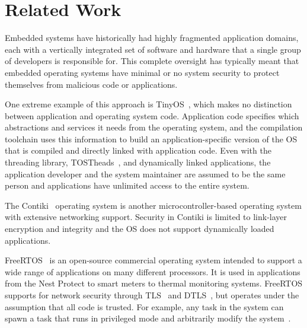 \section{Related Work}

Embedded systems have historically had highly fragmented application domains,
each with a vertically integrated set of software and hardware
that a single group of developers
is responsible for.
This complete oversight has typically meant
that embedded operating systems have
minimal or no system security to protect themselves from malicious code
or applications.

One extreme example of this approach is TinyOS~\cite{tinyos}, which makes no
distinction between application and operating system code. Application
code specifies which abstractions and services it needs from the
operating system, and the compilation toolchain uses this information
to build an application-specific version of the OS that is compiled
and directly linked with application code.
Even with the threading library, TOSTheads~\cite{tosthreads}, and
dynamically linked applications, the
application
developer and the system maintainer are assumed to be the same person
and applications
have unlimited access to the entire system.

The Contiki~\cite{contiki} operating system is another microcontroller-based
operating system
with extensive networking support.
Security in Contiki is limited to
link-layer encryption and integrity and the OS does not support
dynamically loaded applications.

FreeRTOS~\cite{freertos} is an open-source commercial operating system intended to
support a wide range of applications on many different processors. It
is used in applications from the Nest Protect to smart meters to
thermal monitoring systems. FreeRTOS supports for network security
through TLS~\cite{tls} and DTLS~\cite{dtls}, but operates under the
assumption that all code is trusted. For example, any task in the system
can spawn a task that runs in privileged mode and arbitrarily modify
the system~\cite{rtos-tasks,rtos-sec}.

